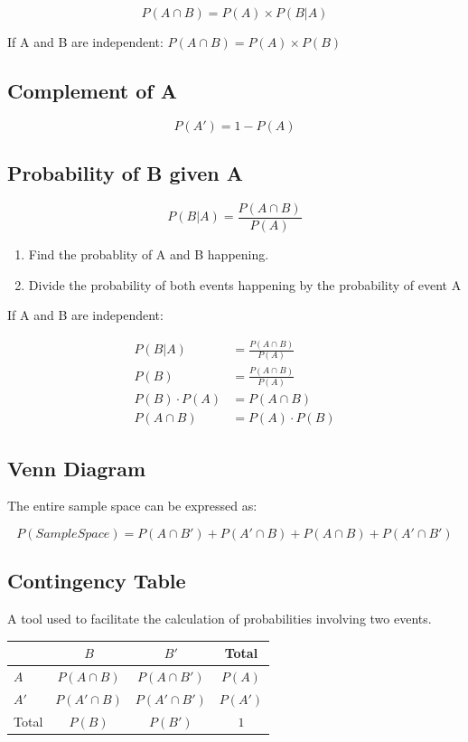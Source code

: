 \documentclass[11pt]{article}
\begin{document}
\[
P(A \cap B) = P(A) \times P(B | A)
\]

If A and B are independent: \(P(A \cap B) = P(A) \times P(B)\)
\subsection{Complement of A}
\label{sec:org1437a2e}

\[
P(A') = 1 - P(A)
\]
\subsection{Probability of B given A}
\label{sec:org3e58e1d}

\[
P(B|A) = \frac{P(A \cap B)}{P(A)}
\]

\begin{enumerate}
\item Find the probablity of A and B happening.

\item Divide the probability of both events happening by the probability of event A
\end{enumerate}

If A and B are independent:


$$\begin{align}
P(B|A) &= \frac{P(A \cap B)}{P(A)} \tag{1}\\
P(B) &= \frac{P(A \cap B)}{P(A)} \tag{2}\\
P(B) \cdot P(A) &= P(A \cap B) \tag{3}\\
P(A \cap B) &= P(A) \cdot P(B) \tag{4} 
\end{align}$$
\subsection{Venn Diagram}
\label{sec:org38ed9bb}

The entire sample space can be expressed as:

\[
P(Sample Space) = P(A \cap B') + P(A' \cap B) + P(A \cap B)  + P(A' \cap B')
\]
\subsection{Contingency Table}
\label{sec:orga92e4a9}

A tool used to facilitate the calculation of probabilities involving two events.

\begin{table}[h]
\centering
\begin{tabular}{l c c c}
\hline
         & $B$              & $B'$               & Total   \\
\hline
$A$      & $P(A \cap B)$    & $P(A \cap B')$     & $P(A)$  \\
$A'$     & $P(A' \cap B)$   & $P(A' \cap B')$    & $P(A')$ \\
\hline
Total    & $P(B)$           & $P(B')$            & $1$     \\
\hline
\end{tabular}
\end{table}
\end{document}
